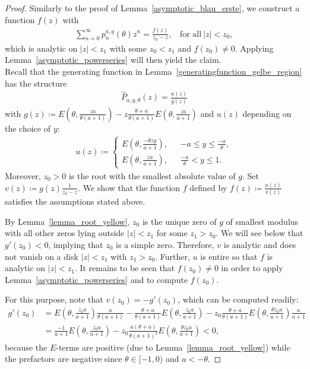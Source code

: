 \documentclass[12pt]{article}
\newcommand{\E}{\mathbb{E}} %
\newcommand{\1}{\mathds{1}}
\theoremstyle{definition}
\theoremstyle{plain}
\theoremstyle{remark}
\begin{document}
\begin{proof}
Similarly to the proof of Lemma~\ref{asymptotic_blau_erste}, we construct a function $f(z)$ with
    \begin{align}\label{gelb_f}
        \sum_{n=0}^{\infty}p_n^{a,y}(\theta)z^n=\frac{f(z)}{z_0-z},~~~~\text{for all}~|z|<z_0,
    \end{align}
   which is analytic on $|z|<z_1$ with some $z_0<z_1$ and $f\! \left(z_0\right)\neq 0$. Applying Lemma~\ref{asymptotic_powerseries} will then yield the claim.
\\Recall that the generating function in Lemma~\ref{generatingfunction_gelbe_region} has the structure 
\begin{align*}
    \hat{P}_{a,y,\theta}(z)=\frac{u(z)}{g(z)}
\end{align*}
with $g(z)\coloneqq E\left(\theta,\frac{za}{\theta(a+1)}\right)-z\frac{\theta +a}{\theta(a+1)}E\left(\theta,\frac{za}{a+1}\right)$ and $u(z)$ depending on the choice of $y$: 
\begin{align*}
    u(z)\coloneqq\begin{cases}
         E\left(\theta,\frac{-\theta zy}{a+1}\right),~~~&-a\leq y \leq \frac{-a}{\theta},
         \\E\left(\theta,\frac{za}{a+1}\right),~~&\frac{-a}{\theta}<y\leq1.
    \end{cases}
\end{align*}
Moreover, $z_0>0$ is the root with the smallest absolute value of $g$. Set $v(z)\coloneqq g(z)\frac{1}{z_0-z}$.
We show that the function $f$ defined by $f(z)\coloneqq\frac{u(z)}{v(z)}$ satisfies the assumptions stated above.

By Lemma~\ref{lemma_root_yellow}, $z_0$ is the unique zero of $g$ of smallest modulus with all other zeros lying outside $|z|<z_1$ for some $z_1>z_0$. We will see below that $g'(z_0)<0$, implying that $z_0$ is a simple zero. Therefore, $v$ is analytic and does not vanish on a disk $|z|<z_1$ with $z_1>z_0$. Further, $u$ is entire so that $f$ is analytic on $|z|<z_1$. It remains to be seen that $f(z_0)\neq 0$ in order to apply Lemma~\ref{asymptotic_powerseries} and to compute $f(z_0)$.

For this purpose, note that $v(z_0)=-g'(z_0)$, which can be computed readily:
\begin{align*}
    g'(z_0) & = E\left(\theta,\frac{z_0 a}{a+1}\right) \frac{a}{\theta(a+1)} - \frac{\theta +a}{\theta(a+1)}E\left(\theta,\frac{z_0 a}{a+1}\right) - z_0 \frac{\theta +a}{\theta(a+1)}E\left(\theta,\frac{\theta z_0a}{a+1}\right) \frac{a}{a+1} 
    \\
    & = \frac{-1}{a+1} E\left(\theta,\frac{z_0 a}{a+1}\right)  - z_0 \frac{a(\theta +a)}{\theta(a+1)^2}E\left(\theta,\frac{\theta z_0a}{a+1}\right) < 0,
\end{align*}
because the $E$-terms are positive (due to Lemma~\ref{lemma_root_yellow}) while the prefactors are negative since $\theta\in[-1,0)$ and $a<-\theta$.


\end{proof}
\end{document}
